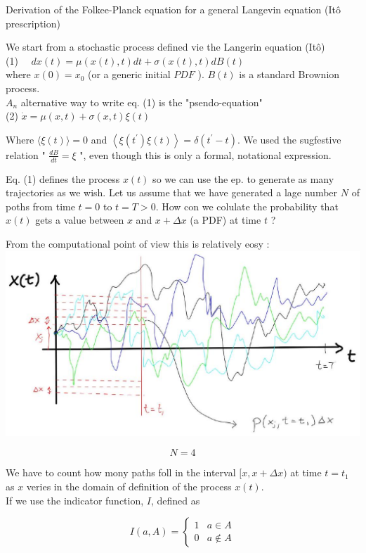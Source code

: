\documentclass[10pt]{article}
\begin{document}
Derivation of the Folkee-Planck equation for a general Langevin equation (Itô prescription)

We start from a stochastic process defined vie the Langerin equation (Itô)\\
(1) $\quad d x(t)=\mu(x(t), t) d t+\sigma(x(t), t) d B(t)$\\
where $x(0)=x_{0}$ (or a generic initial $P D F$ ). $B(t)$ is a standard Brownion process.\\
$A_{n}$ alternative way to write eq. (1) is the "psendo-equation"\\
(2) $\dot{x}=\mu(x, t)+\sigma(x, t) \xi(t)$

Where $\langle\xi(t)\rangle=0$ and $\left\langle\xi\left(t^{\prime}\right) \xi(t)\right\rangle=\delta\left(t^{\prime}-t\right)$. We used the sugfestive relation " $\frac{d B}{d t}=\xi$ ", even though this is only a formal, notational expression.

Eq. (1) defines the process $x(t)$ so we can use the ep. to generate as many trajectories as we wish. Let us assume that we have generated a lage number $N$ of poths from time $t=0$ to $t=T>0$. How con we colulate the probability that $x(t)$ gets a value between $x$ and $x+\Delta x$ (a PDF) at time $t$ ?

From the computational point of view this is relatively eosy :\\
\includegraphics[max width=\textwidth, center]{2025_10_17_1e406b49946272086d2dg-02}

$$
N=4
$$

We have to count how mony paths foll in the interval $[x, x+\Delta x)$ at time $t=t_{1}$ as $x$ veries in the domain of definition of the process $x(t)$.\\
If we use the indicator function, $I$, defined as

$$
I(a, A)= \begin{cases}1 & a \in A \\ 0 & a \notin A\end{cases}
$$
\end{document}
